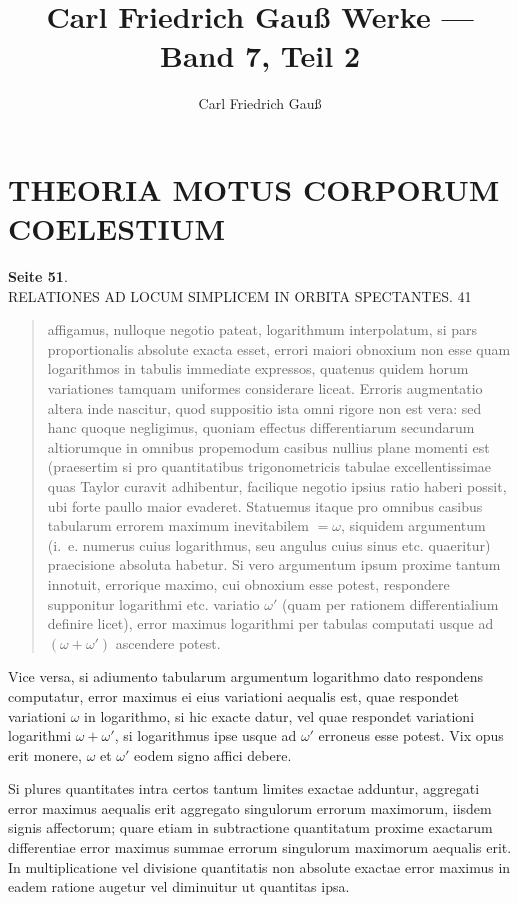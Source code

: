 \documentclass[12pt,a4paper]{article}
\title{Carl Friedrich Gau\ss{} Werke --- Band 7, Teil 2}
\author{Carl Friedrich Gau\ss}
\date{}
\begin{document}
\maketitle
\thispagestyle{empty}

\newpage

\section*{THEORIA MOTUS CORPORUM COELESTIUM}

\textbf{Seite 51}.\\
RELATIONES AD LOCUM SIMPLICEM IN ORBITA SPECTANTES. 41
\begin{quote}
affigamus, nulloque negotio pateat, logarithmum interpolatum, si pars proportionalis absolute exacta esset, errori maiori obnoxium non esse quam logarithmos in tabulis immediate expressos, quatenus quidem horum variationes tamquam uniformes considerare liceat. Erroris augmentatio altera inde nascitur, quod suppositio ista omni rigore non est vera: sed hanc quoque negligimus, quoniam effectus differentiarum secundarum altiorumque in omnibus propemodum casibus nullius plane momenti est (praesertim si pro quantitatibus trigonometricis tabulae excellentissimae quas Taylor curavit adhibentur, facilique negotio ipsius ratio haberi possit, ubi forte paullo maior evaderet. Statuemus itaque pro omnibus casibus tabularum errorem maximum inevitabilem $= \omega$, siquidem argumentum (i.~e. numerus cuius logarithmus, seu angulus cuius sinus etc. quaeritur) praecisione absoluta habetur. Si vero argumentum ipsum proxime tantum innotuit, errorique maximo, cui obnoxium esse potest, respondere supponitur logarithmi etc. variatio $\omega'$ (quam per rationem differentialium definire licet), error maximus logarithmi per tabulas computati usque ad $(\omega + \omega')$ ascendere potest.
\end{quote}

Vice versa, si adiumento tabularum argumentum logarithmo dato respondens computatur, error maximus ei eius variationi aequalis est, quae respondet variationi $\omega$ in logarithmo, si hic exacte datur, vel quae respondet variationi logarithmi $\omega + \omega'$, si logarithmus ipse usque ad $\omega'$ erroneus esse potest. Vix opus erit monere, $\omega$ et $\omega'$ eodem signo affici debere.

Si plures quantitates intra certos tantum limites exactae adduntur, aggregati error maximus aequalis erit aggregato singulorum errorum maximorum, iisdem signis affectorum; quare etiam in subtractione quantitatum proxime exactarum differentiae error maximus summae errorum singulorum maximorum aequalis erit. In multiplicatione vel divisione quantitatis non absolute exactae error maximus in eadem ratione augetur vel diminuitur ut quantitas ipsa.
\end{document}
